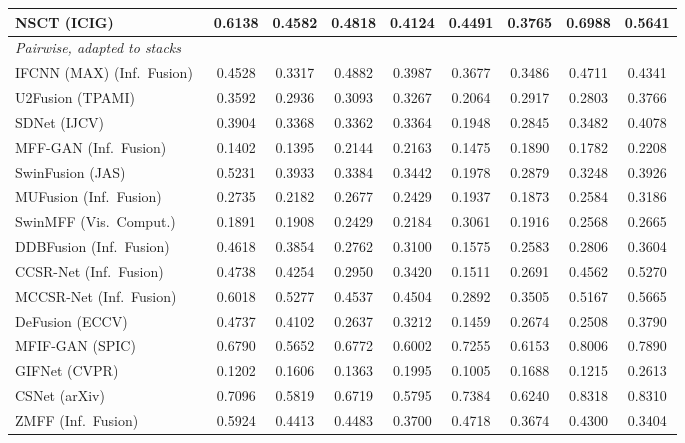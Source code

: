 \begin{table}[H]
{\begin{tabular}{lcccccccc}
NSCT (ICIG)~\cite{yang2007image} & 0.6138 & 0.4582 & 0.4818 & 0.4124 & 0.4491 & 0.3765 & 0.6988 & 0.5641 \\
\midrule
\multicolumn{9}{l}{\textit{Pairwise, adapted to stacks}} \\
IFCNN (MAX) (Inf.\ Fusion)~\cite{zhang2020ifcnn} & 0.4528 & 0.3317 & 0.4882 & 0.3987 & 0.3677 & 0.3486 & 0.4711 & 0.4341 \\
U2Fusion (TPAMI)~\cite{xu2020u2fusion} & 0.3592 & 0.2936 & 0.3093 & 0.3267 & 0.2064 & 0.2917 & 0.2803 & 0.3766 \\
SDNet (IJCV)~\cite{zhang2021sdnet} & 0.3904 & 0.3368 & 0.3362 & 0.3364 & 0.1948 & 0.2845 & 0.3482 & 0.4078 \\
MFF-GAN (Inf.\ Fusion)~\cite{zhang2021mff} & 0.1402 & 0.1395 & 0.2144 & 0.2163 & 0.1475 & 0.1890 & 0.1782 & 0.2208 \\
SwinFusion (JAS)~\cite{ma2022swinfusion} & 0.5231 & 0.3933 & 0.3384 & 0.3442 & 0.1978 & 0.2879 & 0.3248 & 0.3926 \\
MUFusion (Inf.\ Fusion)~\cite{cheng2023mufusion} & 0.2735 & 0.2182 & 0.2677 & 0.2429 & 0.1937 & 0.1873 & 0.2584 & 0.3186 \\
SwinMFF (Vis.\ Comput.)~\cite{xie2024swinmff} & 0.1891 & 0.1908 & 0.2429 & 0.2184 & 0.3061 & 0.1916 & 0.2568 & 0.2665 \\
DDBFusion (Inf.\ Fusion)~\cite{zhang2025ddbfusion} & 0.4618 & 0.3854 & 0.2762 & 0.3100 & 0.1575 & 0.2583 & 0.2806 & 0.3604 \\
CCSR-Net (Inf.\ Fusion)~\cite{ZHENG2025102974} & 0.4738 & 0.4254 & 0.2950 & 0.3420 & 0.1511 & 0.2691 & 0.4562 & 0.5270 \\
MCCSR-Net (Inf.\ Fusion)~\cite{ZHENG2025102974} & 0.6018 & 0.5277 & 0.4537 & 0.4504 & 0.2892 & 0.3505 & 0.5167 & 0.5665 \\
DeFusion (ECCV)~\cite{liang2022defusion} & 0.4737 & 0.4102 & 0.2637 & 0.3212 & 0.1459 & 0.2674 & 0.2508 & 0.3790 \\
MFIF-GAN (SPIC)~\cite{wang2021mfifgan} & 0.6790 & 0.5652 & 0.6772 & 0.6002 & 0.7255 & 0.6153 & 0.8006 & 0.7890 \\
GIFNet (CVPR)~\cite{cheng2025gifnet} & 0.1202 & 0.1606 & 0.1363 & 0.1995 & 0.1005 & 0.1688 & 0.1215 & 0.2613 \\
CSNet (arXiv)~\cite{csnet2026} & 0.7096 & 0.5819 & 0.6719 & 0.5795 & 0.7384 & 0.6240 & 0.8318 & 0.8310 \\
ZMFF (Inf.\ Fusion)~\cite{hu2023zmff} & 0.5924 & 0.4413 & 0.4483 & 0.3700 & 0.4718 & 0.3674 & 0.4300 & 0.3404 \\

\end{tabular}}
\end{table}
